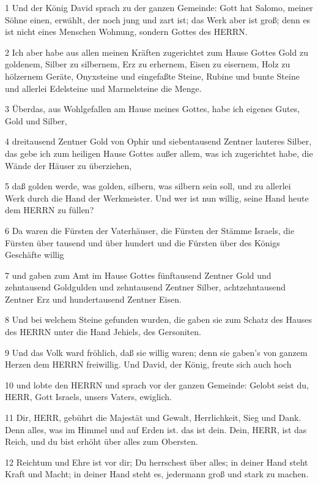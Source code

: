 \par 1 Und der König David sprach zu der ganzen Gemeinde: Gott hat Salomo, meiner Söhne einen, erwählt, der noch jung und zart ist; das Werk aber ist groß; denn es ist nicht eines Menschen Wohnung, sondern Gottes des HERRN.
\par 2 Ich aber habe aus allen meinen Kräften zugerichtet zum Hause Gottes Gold zu goldenem, Silber zu silbernem, Erz zu erhernem, Eisen zu eisernem, Holz zu hölzernem Geräte, Onyxsteine und eingefaßte Steine, Rubine und bunte Steine und allerlei Edelsteine und Marmelsteine die Menge.
\par 3 Überdas, aus Wohlgefallen am Hause meines Gottes, habe ich eigenes Gutes, Gold und Silber,
\par 4 dreitausend Zentner Gold von Ophir und siebentausend Zentner lauteres Silber, das gebe ich zum heiligen Hause Gottes außer allem, was ich zugerichtet habe, die Wände der Häuser zu überziehen,
\par 5 daß golden werde, was golden, silbern, was silbern sein soll, und zu allerlei Werk durch die Hand der Werkmeister. Und wer ist nun willig, seine Hand heute dem HERRN zu füllen?
\par 6 Da waren die Fürsten der Vaterhäuser, die Fürsten der Stämme Israels, die Fürsten über tausend und über hundert und die Fürsten über des Königs Geschäfte willig
\par 7 und gaben zum Amt im Hause Gottes fünftausend Zentner Gold und zehntausend Goldgulden und zehntausend Zentner Silber, achtzehntausend Zentner Erz und hundertausend Zentner Eisen.
\par 8 Und bei welchem Steine gefunden wurden, die gaben sie zum Schatz des Hauses des HERRN unter die Hand Jehiels, des Gersoniten.
\par 9 Und das Volk ward fröhlich, daß sie willig waren; denn sie gaben's von ganzem Herzen dem HERRN freiwillig. Und David, der König, freute sich auch hoch
\par 10 und lobte den HERRN und sprach vor der ganzen Gemeinde: Gelobt seist du, HERR, Gott Israels, unsers Vaters, ewiglich.
\par 11 Dir, HERR, gebührt die Majestät und Gewalt, Herrlichkeit, Sieg und Dank. Denn alles, was im Himmel und auf Erden ist. das ist dein. Dein, HERR, ist das Reich, und du bist erhöht über alles zum Obersten.
\par 12 Reichtum und Ehre ist vor dir; Du herrschest über alles; in deiner Hand steht Kraft und Macht; in deiner Hand steht es, jedermann groß und stark zu machen.
